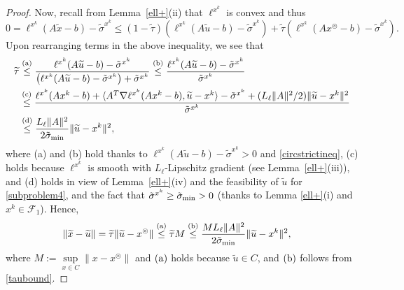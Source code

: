 \documentclass[10pt]{article}
\numberwithin{equation}{section}
\def\sigmamin{{\rm\tilde{\sigma}_{min}}}
\def\xfeasss{x^\circledcirc}
\begin{document}
\begin{proof}
Now, recall from Lemma~\ref{ell+}(ii) that $\ell^{x^k}$ is convex and thus
\[
0 = \ell^{x^k}(A\widetilde{x} - b) - \tilde{\sigma}^{x^k} \leq (1 - \widetilde{\tau})\left(\ell^{x^k}(A\widetilde{u} - b) - \tilde{\sigma}^{x^k}\right) + \widetilde{\tau}\left(\ell^{x^k}(A\xfeasss - b) - \tilde{\sigma}^{x^k}\right).
\]
Upon rearranging terms in the above inequality, we see that
\begin{equation}\label{taubound}
\begin{aligned}
\widetilde{\tau}&\overset{\rm (a)}\leq\frac{\ell^{x^k}(A\widetilde{u} - b) - \tilde{\sigma}^{x^k}}{\left(\ell^{x^k}(A\widetilde{u} - b) - \tilde{\sigma}^{x^k}\right) + \tilde{\sigma}^{x^k}} \overset{\rm (b)}\leq \frac{\ell^{x^k}(A\widetilde{u} - b) - \tilde{\sigma}^{x^k}}{\tilde{\sigma}^{x^k}} \\
&\overset{\rm (c)}\le \frac{\ell^{x^k}(Ax^k - b) + \langle A^T\nabla \ell^{x^k}(Ax^k - b),\widetilde{u}-x^k\rangle - \tilde{\sigma}^{x^k} + (L_{\ell}\|A\|^2/2)\|\widetilde{u} - x^k\|^2}{\tilde{\sigma}^{x^k}}\\
&\overset{\rm (d)}\leq \frac{L_{\ell}\|A\|^2}{2\sigmamin}\|\widetilde{u} - x^k\|^2,
\end{aligned}
\end{equation}
where (a) and (b) hold thanks to $\ell^{x^k}(A\widetilde{u} - b) - \tilde{\sigma}^{x^k} > 0$ and \eqref{circstrictineq}, (c) holds because $\ell^{x^k}$ is smooth with $L_\ell$-Lipschitz gradient (see Lemma~\ref{ell+}(iii)), and (d) holds in view of Lemma~\ref{ell+}(iv) and the feasibility of $\widetilde u$ for \eqref{subproblem4}, and the fact that $\tilde{\sigma}^{x^k} \ge \sigmamin > 0$ (thanks to Lemma \ref{ell+}(i) and $x^k\in\mathcal{F}_1$). Hence,
\[
\begin{aligned}
\|\widetilde{x} - \widetilde{u}\|& = \widetilde{\tau}\|\widetilde{u} - \xfeasss\|\overset{\rm (a)}\leq \widetilde{\tau}M \overset{\rm (b)}\leq \frac{ML_{\ell}\|A\|^2}{2\sigmamin}\|\widetilde{u} - x^k\|^2,
\end{aligned}
\]
where $M := \sup\limits_{x\in C}\|x - \xfeasss\|$ and $\rm (a)$ holds because $\widetilde{u}\in C$, and $\rm(b)$ follows from \eqref{taubound}.


\end{proof}
\end{document}
